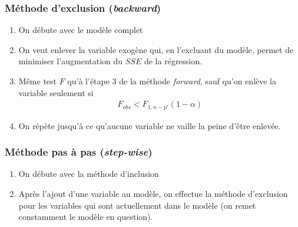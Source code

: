 \documentclass[10pt, french]{article}
\begin{document}
\begin{multicols*}{3}
\subsubsection*{Méthode d'exclusion (\textit{backward})}
\begin{enumerate}
\item On débute avec le modèle complet
\item On veut enlever la variable exogène qui, en l'excluant du modèle, permet de minimiser l'augmentation du $SSE$ de la régression.
\item Même test $F$ qu'à l'étape 3 de la méthode \textit{forward}, sauf qu'on enlève la variable seulement si
\begin{align*}
F_{obs} < F_{1, n-p'}(1-\alpha)
\end{align*}
\item On répète jusqu'à ce qu'aucune variable ne vaille la peine d'être enlevée.
\end{enumerate}


\subsubsection*{Méthode pas à pas (\textit{step-wise})}
\begin{enumerate}
\item On débute avec la méthode d'inclusion
\item Après l'ajout d'une variable au modèle, on effectue la méthode d'exclusion pour les variables qui sont actuellement dans le modèle (on remet constamment le modèle en question).
\end{enumerate}







\end{multicols*}
\end{document}
